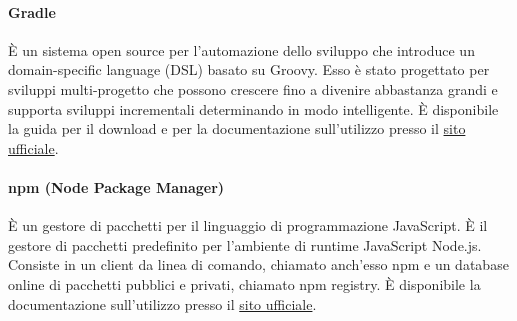 \paragraph{Gradle}
È un sistema open source per l'automazione dello sviluppo che introduce un domain-specific language (DSL) basato su Groovy.
Esso è stato progettato per sviluppi multi-progetto che possono crescere fino a divenire abbastanza grandi e supporta sviluppi incrementali determinando in modo intelligente.
È disponibile la guida per il download e per la documentazione sull'utilizzo presso il \href{https://gradle.org/}{sito ufficiale}.

\paragraph{npm (Node Package Manager)}
È un gestore di pacchetti per il linguaggio di programmazione JavaScript. È il gestore di pacchetti predefinito per l'ambiente di runtime JavaScript Node.js. 
Consiste in un client da linea di comando, chiamato anch'esso npm e un database online di pacchetti pubblici e privati, chiamato npm registry.
È disponibile la documentazione sull'utilizzo presso il \href{https://www.npmjs.com/}{sito ufficiale}.